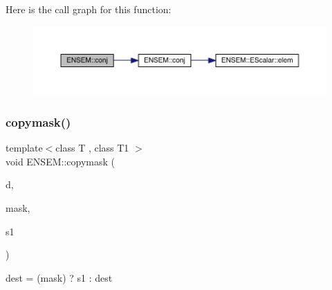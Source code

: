 Here is the call graph for this function\+:\nopagebreak
\begin{figure}[H]
\begin{center}
\leavevmode
\includegraphics[width=350pt]{d8/d55/group__obsmatrix_gaa0e14166cccccfb643584dfa83138cb2_cgraph}
\end{center}
\end{figure}
\mbox{\label{group__obsmatrix_gaa09c3011b1e6555dcc6e4f9b51d1f5de}} 
\subsubsection{\texorpdfstring{copymask()}{copymask()}}
{\footnotesize\ttfamily template$<$class T , class T1 $>$ \\
void E\+N\+S\+E\+M\+::copymask (\begin{DoxyParamCaption}\item[{\mbox{\hyperlink{classENSEM_1_1OMatrix}{O\+Matrix}}$<$ T $>$ \&}]{d,  }\item[{const \mbox{\hyperlink{classENSEM_1_1OScalar}{O\+Scalar}}$<$ T1 $>$ \&}]{mask,  }\item[{const \mbox{\hyperlink{classENSEM_1_1OMatrix}{O\+Matrix}}$<$ T $>$ \&}]{s1 }\end{DoxyParamCaption})\hspace{0.3cm}{\ttfamily [inline]}}



dest = (mask) ? s1 \+: dest 

